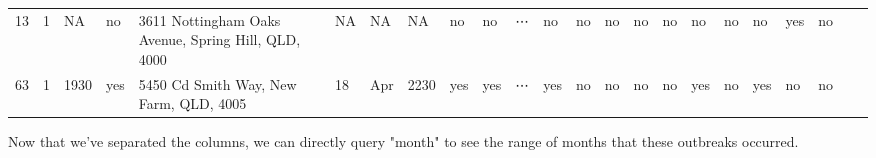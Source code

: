 \documentclass[11pt]{article}
\begin{document}
\begin{tabular}{r|llllllllllllllllllllll}
	 13                                                  & 1                                                   &   NA                                                & no                                                  & 3611 Nottingham Oaks Avenue, Spring Hill, QLD, 4000 & NA                                                  & NA                                                  &   NA                                                & no                                                  & no                                                  & ⋯                                                   & no                                                  & no                                                  & no                                                  & no                                                  & no                                                  & no                                                  & no                                                  & no                                                  & yes                                                 & no                                                 \\
	 63                                                  & 1                                                   & 1930                                                & yes                                                 & 5450 Cd Smith Way, New Farm, QLD, 4005              & 18                                                  & Apr                                                 & 2230                                                & yes                                                 & yes                                                 & ⋯                                                   & yes                                                 & no                                                  & no                                                  & no                                                  & no                                                  & yes                                                 & no                                                  & yes                                                 & no                                                  & no                                                 \\
\end{tabular}


    
    Now that we've separated the columns, we can directly query "month" to
see the range of months that these outbreaks occurred.
\end{document}
